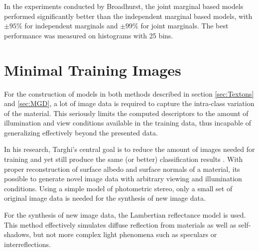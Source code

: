 In the experiments conducted by Broadhurst, the joint marginal based models performed significantly better than the independent marginal based models, with $\pm 95\%$ for independent marginals and $\pm 99\%$ for joint marginals. The best performance was measured on histograms with 25 bins.





\section{Minimal Training Images}\label{sec:Minimal}

For the construction of models in both methods described in section \ref{sec:Textons} and \ref{sec:MGD}, a lot of image data is required to capture the intra-class variation of the material. This seriously limits the computed descriptors to the amount of illumination and view conditions available in the training data, thus incapable of generalizing effectively beyond the presented data.

In his research, Targhi's central goal is to reduce the amount of images needed for training and yet still produce the same (or better) classification results \cite{Targhi}. With proper reconstruction of surface albedo and surface normals of a material, its possible to generate novel image data with arbitrary viewing and illumination conditions. Using a simple model of photometric stereo, only a small set of original image data is needed for the synthesis of new image data.

For the synthesis of new image data, the Lambertian reflectance model is used. This method effectively simulates diffuse reflection from materials as well as self-shadows, but not more complex light phenomena such as speculars or interreflections. 

